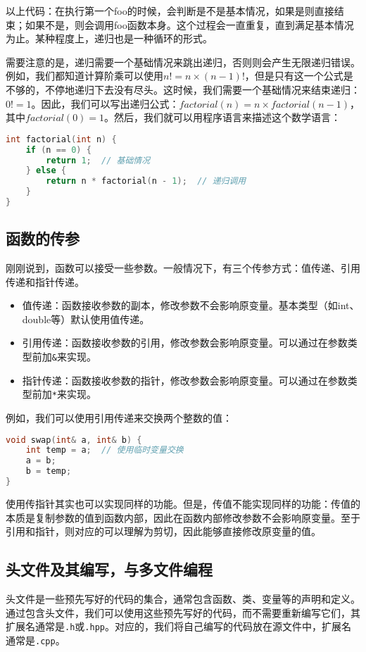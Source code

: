 \documentclass[../main.tex]{subfiles}
\begin{document}
以上代码：在执行第一个foo的时候，会判断是不是基本情况，如果是则直接结束；如果不是，则会调用foo函数本身。这个过程会一直重复，直到满足基本情况为止。某种程度上，递归也是一种循环的形式。

需要注意的是，递归需要一个基础情况来跳出递归，否则则会产生无限递归错误。例如，我们都知道计算阶乘可以使用$n!=n\times(n-1)!$，但是只有这一个公式是不够的，不停地递归下去没有尽头。这时候，我们需要一个基础情况来结束递归：$0!=1$。因此，我们可以写出递归公式：$factorial(n) = n \times factorial(n-1)$，其中$factorial(0) = 1$。然后，我们就可以用程序语言来描述这个数学语言：
\begin{lstlisting}[language=C++]
int factorial(int n) {
    if (n == 0) {
        return 1;  // 基础情况
    } else {
        return n * factorial(n - 1);  // 递归调用
    }
}
\end{lstlisting}

\subsection{函数的传参}

刚刚说到，函数可以接受一些参数。一般情况下，有三个传参方式：值传递、引用传递和指针传递。
\begin{itemize}
  \item 值传递：函数接收参数的副本，修改参数不会影响原变量。基本类型（如int、double等）默认使用值传递。
  \item 引用传递：函数接收参数的引用，修改参数会影响原变量。可以通过在参数类型前加\texttt{\&}来实现。
  \item 指针传递：函数接收参数的指针，修改参数会影响原变量。可以通过在参数类型前加\texttt{*}来实现。
\end{itemize}
例如，我们可以使用引用传递来交换两个整数的值：
\begin{lstlisting}[language=C++]
void swap(int& a, int& b) {
    int temp = a;  // 使用临时变量交换
    a = b;
    b = temp;
}
\end{lstlisting}
使用传指针其实也可以实现同样的功能。但是，传值不能实现同样的功能：传值的本质是复制参数的值到函数内部，因此在函数内部修改参数不会影响原变量。至于引用和指针，则对应的可以理解为剪切，因此能够直接修改原变量的值。


\subsection{头文件及其编写，与多文件编程}

头文件是一些预先写好的代码的集合，通常包含函数、类、变量等的声明和定义。通过包含头文件，我们可以使用这些预先写好的代码，而不需要重新编写它们，其扩展名通常是\texttt{.h}或\texttt{.hpp}。对应的，我们将自己编写的代码放在源文件中，扩展名通常是\texttt{.cpp}。
\end{document}
